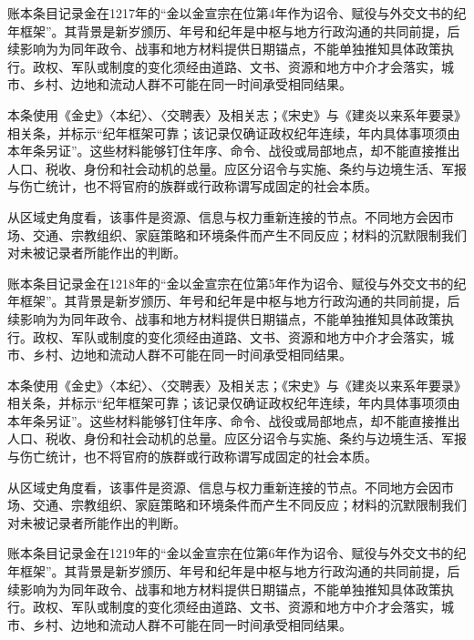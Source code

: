 账本条目记录金在1217年的“金以金宣宗在位第4年作为诏令、赋役与外交文书的纪年框架”。其背景是新岁颁历、年号和纪年是中枢与地方行政沟通的共同前提，后续影响为为同年政令、战事和地方材料提供日期锚点，不能单独推知具体政策执行。政权、军队或制度的变化须经由道路、文书、资源和地方中介才会落实，城市、乡村、边地和流动人群不可能在同一时间承受相同结果。

本条使用《金史》〈本纪〉、〈交聘表〉及相关志；《宋史》与《建炎以来系年要录》相关条，并标示“纪年框架可靠；该记录仅确证政权纪年连续，年内具体事项须由本年条另证”。这些材料能够钉住年序、命令、战役或局部地点，却不能直接推出人口、税收、身份和社会动机的总量。应区分诏令与实施、条约与边境生活、军报与伤亡统计，也不将官府的族群或行政称谓写成固定的社会本质。

从区域史角度看，该事件是资源、信息与权力重新连接的节点。不同地方会因市场、交通、宗教组织、家庭策略和环境条件而产生不同反应；材料的沉默限制我们对未被记录者所能作出的判断。

账本条目记录金在1218年的“金以金宣宗在位第5年作为诏令、赋役与外交文书的纪年框架”。其背景是新岁颁历、年号和纪年是中枢与地方行政沟通的共同前提，后续影响为为同年政令、战事和地方材料提供日期锚点，不能单独推知具体政策执行。政权、军队或制度的变化须经由道路、文书、资源和地方中介才会落实，城市、乡村、边地和流动人群不可能在同一时间承受相同结果。

本条使用《金史》〈本纪〉、〈交聘表〉及相关志；《宋史》与《建炎以来系年要录》相关条，并标示“纪年框架可靠；该记录仅确证政权纪年连续，年内具体事项须由本年条另证”。这些材料能够钉住年序、命令、战役或局部地点，却不能直接推出人口、税收、身份和社会动机的总量。应区分诏令与实施、条约与边境生活、军报与伤亡统计，也不将官府的族群或行政称谓写成固定的社会本质。

从区域史角度看，该事件是资源、信息与权力重新连接的节点。不同地方会因市场、交通、宗教组织、家庭策略和环境条件而产生不同反应；材料的沉默限制我们对未被记录者所能作出的判断。

账本条目记录金在1219年的“金以金宣宗在位第6年作为诏令、赋役与外交文书的纪年框架”。其背景是新岁颁历、年号和纪年是中枢与地方行政沟通的共同前提，后续影响为为同年政令、战事和地方材料提供日期锚点，不能单独推知具体政策执行。政权、军队或制度的变化须经由道路、文书、资源和地方中介才会落实，城市、乡村、边地和流动人群不可能在同一时间承受相同结果。

